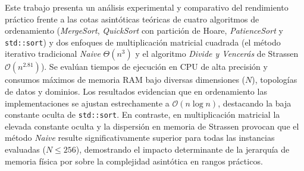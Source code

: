 Este trabajo presenta un análisis experimental y comparativo del rendimiento práctico frente a las cotas asintóticas teóricas de cuatro algoritmos de ordenamiento (\textit{MergeSort}, \textit{QuickSort} con partición de Hoare, \textit{PatienceSort} y \texttt{std::sort}) y dos enfoques de multiplicación matricial cuadrada (el método iterativo tradicional \textit{Naive} $\Theta(n^3)$ y el algoritmo \textit{Divide y Vencerás} de Strassen $\mathcal{O}(n^{2.81})$). Se evalúan tiempos de ejecución en CPU de alta precisión y consumos máximos de memoria RAM bajo diversas dimensiones ($N$), topologías de datos y dominios. Los resultados evidencian que en ordenamiento las implementaciones se ajustan estrechamente a $\mathcal{O}(n \log n)$, destacando la baja constante oculta de \texttt{std::sort}. En contraste, en multiplicación matricial la elevada constante oculta y la dispersión en memoria de Strassen provocan que el método \textit{Naive} resulte significativamente superior para todas las instancias evaluadas ($N \le 256$), demostrando el impacto determinante de la jerarquía de memoria física por sobre la complejidad asintótica en rangos prácticos.